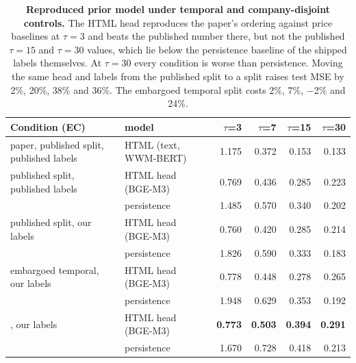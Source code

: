 \begin{table}[t]
\centering
\small
\begin{tabular}{llrrrr}
\toprule
Condition (EC) & model & $\tau$=3 & $\tau$=7 & $\tau$=15 & $\tau$=30 \\
\midrule
paper, published split, published labels & HTML (text, WWM-BERT) & 1.175 & 0.372 & 0.153 & 0.133 \\
\midrule
published split, published labels & HTML head (BGE-M3) & 0.769 & 0.436 & 0.285 & 0.223 \\
 & persistence & 1.485 & 0.570 & 0.340 & 0.202 \\
published split, our labels & HTML head (BGE-M3) & 0.760 & 0.420 & 0.285 & 0.214 \\
 & persistence & 1.826 & 0.590 & 0.333 & 0.183 \\
\midrule
embargoed temporal, our labels & HTML head (BGE-M3) & 0.778 & 0.448 & 0.278 & 0.265 \\
 & persistence & 1.948 & 0.629 & 0.353 & 0.192 \\
\tickerdisjoint{}, our labels & HTML head (BGE-M3) & \textbf{0.773} & \textbf{0.503} & \textbf{0.394} & \textbf{0.291} \\
 & persistence & 1.670 & 0.728 & 0.418 & 0.213 \\
\bottomrule
\end{tabular}
\caption{\textbf{Reproduced prior model under temporal and company-disjoint controls.} The HTML head reproduces the paper's ordering against price
baselines at $\tau{=}3$ and beats the published number there, but not the published
$\tau{=}15$ and $\tau{=}30$ values, which lie below the persistence baseline of the
shipped labels themselves. At $\tau{=}30$ every condition is worse than
persistence. Moving the same head and labels from the published split to a
\tickerdisjoint{} split raises test MSE by 2\%, 20\%, 38\% and 36\%. The embargoed
temporal split costs 2\%, 7\%, $-$2\% and 24\%.}
\label{tab:repro}
\end{table}
